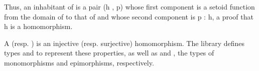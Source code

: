 \begin{code}%
\>[0]\<%
\\
\>[0][@{}l@{\AgdaIndent{1}}]%
\>[1]\AgdaSpace{}%
\AgdaSpace{}%
\AgdaSymbol{(}\AgdaSpace{}%
\AgdaSymbol{:}\AgdaSpace{}%
\AgdaOperator{\AgdaFunction{𝔻[}}\AgdaSpace{}%
\AgdaSpace{}%
\AgdaOperator{\AgdaFunction{]}}\AgdaSpace{}%
\AgdaSpace{}%
\AgdaOperator{\AgdaFunction{𝔻[}}\AgdaSpace{}%
\AgdaSpace{}%
\AgdaOperator{\AgdaFunction{]}}\AgdaSymbol{)}\AgdaSpace{}%
\AgdaSymbol{:}\AgdaSpace{}%
\AgdaSpace{}%
\AgdaSymbol{(}\AgdaSpace{}%
\AgdaSpace{}%
\AgdaSpace{}%
\AgdaSpace{}%
\AgdaSpace{}%
\AgdaSpace{}%
\AgdaSymbol{)}\AgdaSpace{}%
\<%
\\
\>[1][@{}l@{\AgdaIndent{0}}]%
\>[2]\AgdaSpace{}%
\AgdaSpace{}%
\AgdaSymbol{;}\AgdaSpace{}%
\AgdaSpace{}%
\AgdaSpace{}%
\AgdaSymbol{:}\AgdaSpace{}%
\AgdaSpace{}%
\<%
\\
%
\>[1]\AgdaSpace{}%
\AgdaSymbol{:}\AgdaSpace{}%
\AgdaSpace{}%
\AgdaSymbol{\AgdaUnderscore{}}\<%
\\
%
\>[1]\AgdaSpace{}%
\AgdaSymbol{=}\AgdaSpace{}%
\AgdaSpace{}%
\AgdaSymbol{(}\AgdaOperator{\AgdaFunction{𝔻[}}\AgdaSpace{}%
\AgdaSpace{}%
\AgdaOperator{\AgdaFunction{]}}\AgdaSpace{}%
\AgdaSpace{}%
\AgdaOperator{\AgdaFunction{𝔻[}}\AgdaSpace{}%
\AgdaSpace{}%
\AgdaOperator{\AgdaFunction{]}}\AgdaSymbol{)}\AgdaSpace{}%
\<%
\\
\>[0]\<%
\end{code}
Thus, an inhabitant of  is a pair (\ab h , \ab p) whose first component is
a setoid function from the domain of  to that of  and whose second component
is \ab p :  \ab h, a proof that \ab h is a homomorphism.

A  (resp. ) is an injective (resp. surjective)
homomorphism.  The \agdaalgebras library defines types  and  to
represent these properties, as well as  and , the types of monomorphisms
and epimorphisms, respectively.
\ifshort %
\else    %

